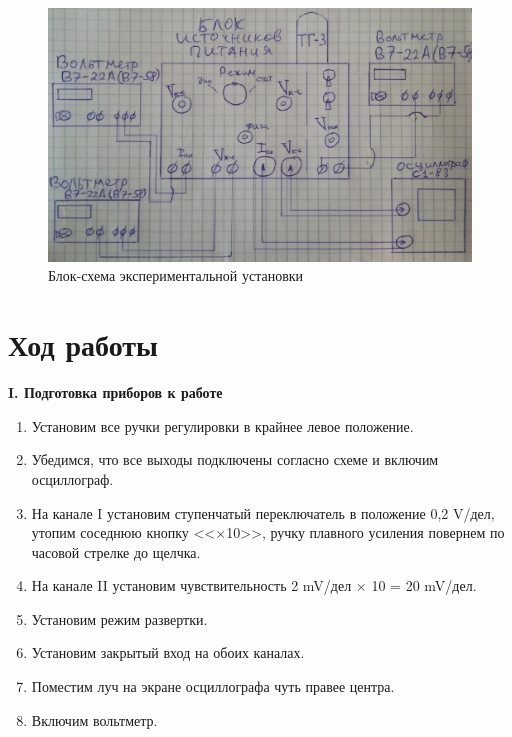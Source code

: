 	\begin{figure}[h!]
		\centering
		\includegraphics[width=0.8\linewidth]{./Pictures/4.jpg}
		\caption{Блок-схема экспериментальной установки}
	\end{figure}

	
	\newpage
	\section*{Ход работы}
	
	\begin{center}
		\textbf{I. Подготовка приборов к работе}
	\end{center}

	\begin{enumerate}
		\item Установим все ручки регулировки в крайнее левое положение.
		
		\item Убедимся, что все выходы подключены согласно схеме и включим осциллограф.
		
		\item На канале I установим ступенчатый переключатель в положение 0,2 V/дел, утопим соседнюю кнопку <<$\times$10>>, ручку плавного усиления повернем по часовой стрелке до щелчка.
		
		\item На канале II установим чувствительность 2 mV/дел $\times$ 10 = 20 mV/дел.
		
		\item Установим режим развертки.
		
		\item Установим закрытый вход на обоих каналах.
		
		\item Поместим луч на экране осциллографа чуть правее центра.
		
		\item Включим вольтметр.
	\end{enumerate}

